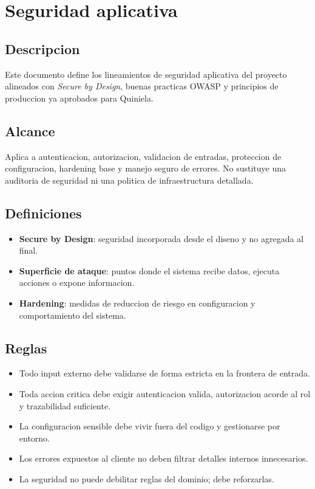 \section{Seguridad aplicativa}

\subsection{Descripcion}

Este documento define los lineamientos de seguridad aplicativa del proyecto alineados con \textit{Secure by Design}, buenas practicas OWASP y principios de produccion ya aprobados para Quiniela.

\subsection{Alcance}

Aplica a autenticacion, autorizacion, validacion de entradas, proteccion de configuracion, hardening base y manejo seguro de errores. No sustituye una auditoria de seguridad ni una politica de infraestructura detallada.

\subsection{Definiciones}

\begin{itemize}
  \item \textbf{Secure by Design}: seguridad incorporada desde el diseno y no agregada al final.
  \item \textbf{Superficie de ataque}: puntos donde el sistema recibe datos, ejecuta acciones o expone informacion.
  \item \textbf{Hardening}: medidas de reduccion de riesgo en configuracion y comportamiento del sistema.
\end{itemize}

\subsection{Reglas}

\begin{itemize}
  \item Todo input externo debe validarse de forma estricta en la frontera de entrada.
  \item Toda accion critica debe exigir autenticacion valida, autorizacion acorde al rol y trazabilidad suficiente.
  \item La configuracion sensible debe vivir fuera del codigo y gestionarse por entorno.
  \item Los errores expuestos al cliente no deben filtrar detalles internos innecesarios.
  \item La seguridad no puede debilitar reglas del dominio; debe reforzarlas.
\end{itemize}

